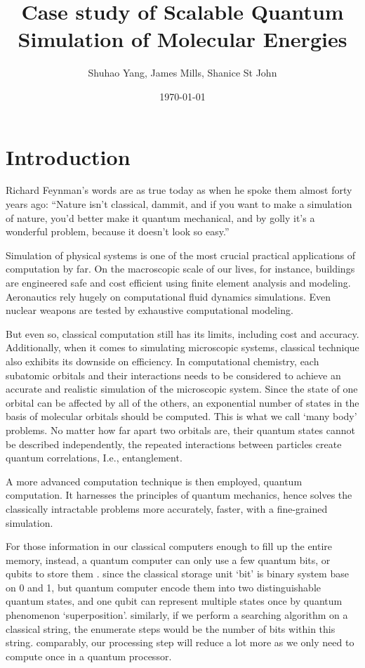 \documentclass[12pt]{article}
\begin{document}
\title{Case study of Scalable Quantum Simulation of Molecular Energies}
\author{Shuhao Yang, James Mills, Shanice St John}
\date{\today}
\maketitle
\section{Introduction}
Richard Feynman’s words are as true today as when he spoke them almost forty years ago: “Nature isn't classical, dammit, and if you want to make a simulation of nature, you'd better make it quantum mechanical, and by golly it's a wonderful problem, because it doesn't look so easy.”

Simulation of physical systems is one of the most crucial practical applications of computation by far.  On the macroscopic scale of our lives, for instance, buildings are engineered safe and cost efficient using ﬁnite element analysis and modeling. Aeronautics rely hugely on computational ﬂuid dynamics simulations. Even nuclear weapons are tested by exhaustive computational modeling.

But even so, classical computation still has its limits, including cost and accuracy. Additionally, when it comes to simulating microscopic systems, classical technique also exhibits its downside on efficiency. In computational chemistry, each subatomic orbitals and their interactions needs to be considered to achieve an accurate and realistic simulation of the microscopic system. Since the state of one orbital can be affected by all of the others, an exponential number of states in the basis of molecular orbitals should be computed. This is what we call ‘many body’ problems. No matter how far apart two orbitals are, their quantum states cannot be described independently, the repeated interactions between particles create quantum correlations, I.e., entanglement.

A more advanced computation technique is then employed, quantum computation. It harnesses the principles of quantum mechanics, hence solves the classically intractable problems more accurately, faster, with a fine-grained simulation.

For those information in our classical computers enough to fill up the entire memory, instead, a quantum computer can only use a few quantum bits, or qubits to store them \cite{trabesinger2012quantum}. since the classical storage unit ‘bit’ is binary system base on 0 and 1, but quantum computer encode them into two distinguishable quantum states, and one qubit can represent multiple states once by quantum phenomenon ‘superposition’. similarly, if we perform a searching algorithm on a classical string, the enumerate steps would be the number of bits within this string. comparably, our processing step will reduce a lot more as we only need to compute once in a quantum processor.
\end{document}
